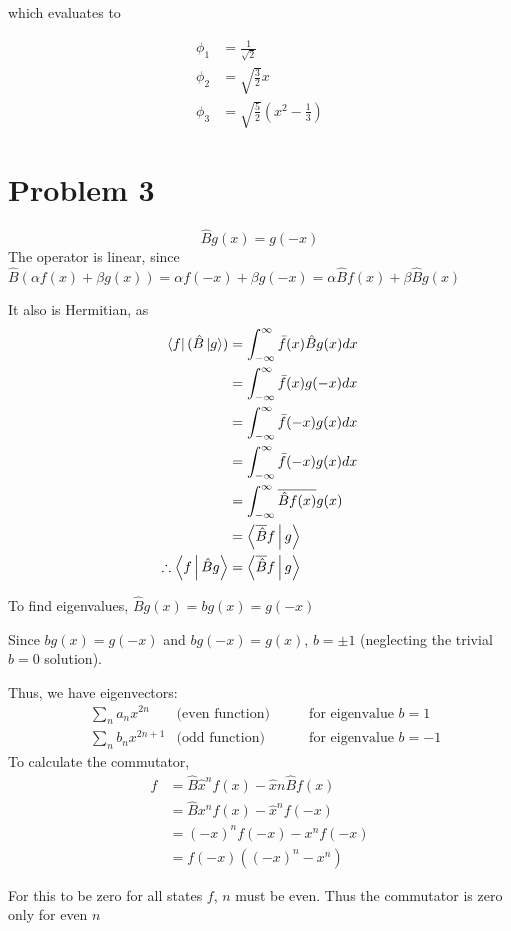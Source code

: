 \documentclass[12pt]{article}
\begin{document}
which evaluates to

\begin{align*}
\phi_1&=\frac1{\sqrt{2}}\\
\phi_2&=\sqrt{\frac32}x\\
\phi_3&=\sqrt{\frac52}\left(x^2-\frac13\right)
\end{align*}
\section*{Problem 3}

$$\hat Bg(x)=g(-x)$$
The operator is linear, since $\hat B(\alpha f(x)+\beta g(x))=\alpha f(-x)+\beta g(-x)=\alpha \hat Bf(x)+\beta\hat B g(x)$

It also is Hermitian, as \begin{align*}\Bra{f}(\hat B\Ket{g})&=\int_{-\infty}^\infty \bar{f}(x)\hat B g(x) dx\\
&= \int_{-\infty}^\infty \bar{f}(x) g(-x) dx\\
&= \int_{-\infty}^\infty \bar{f}(-x)g(x)dx\\
&= \int_{-\infty}^\infty \bar{f}(-x)g(x)dx\\
&=\int_{-\infty}^\infty \overline{\hat B f(x)}g(x)\\
&=\Braket{\overline{\hat B} f|g}\\
\therefore \Braket{f|\hat B g}&=\Braket{\overline{\hat B} f|g}
\end{align*}

To find eigenvalues, $\hat B g(x)=b g(x)=g(-x)$

Since $b g(x)=g(-x)$ and $b g(-x)=g(x)$, $b=\pm 1$ (neglecting the trivial $b=0$ solution).

Thus, we have eigenvectors:
\begin{align*}
&\sum_n a_n x^{2n} & \text{(even function)}\qquad &\text{for eigenvalue $b=1$}\\
&\sum_n b_n x^{2n+1}& \text{(odd function)}\qquad &\text{for eigenvalue $b=-1$}
\end{align*} 
To calculate the commutator,
\begin{align*}
 [B,\hat{x}^n]f&=\hat B \hat x^n f(x)-\hat xn \hat B f(x)\\
 &=\hat B x^n f(x) - \hat x^n f(-x)\\
 &= (-x)^{n}f(-x)-x^n f(-x)\\
 &= f(-x)((-x)^{n}-x^n)
\end{align*}

For this to be zero for all states $f$, $n$ must be even. Thus the commutator is zero only for even $n$
\end{document}
